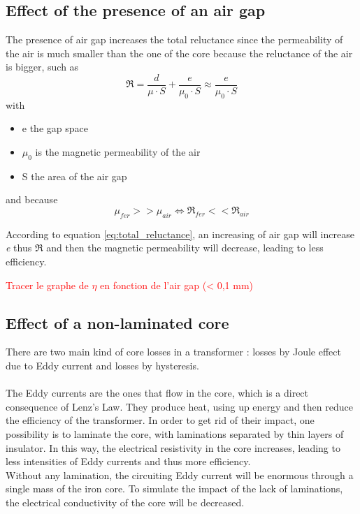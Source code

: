 \documentclass[12pt,a4paper]{report}
\begin{document}
\subsection{Effect of the presence of an air gap}
The presence of air gap increases the total reluctance since the permeability of the air is much smaller than the one of the core because the reluctance of the air is bigger, such as
\begin{equation}
    \Re = \frac{d}{\mu \cdot S} + \frac{e}{\mu_0 \cdot S} \approx \frac{e}{\mu_0 \cdot S}
    \label{eq:total_reluctance}
\end{equation}
with
\begin{itemize}
    \item e the gap space
    \item $\mu_0$ is the magnetic permeability of the air
    \item S the area of the air gap
\end{itemize}

and because 
\begin{equation}
    \mu_{fer} >> \mu_{air} \iff {\Re_{fer}} << {\Re_{air}}
\end{equation}

According to equation \ref{eq:total_reluctance}, an increasing of air gap will increase \textit{e} thus $\Re$ and then the magnetic permeability will decrease, leading to less efficiency.

\textcolor{red}{Tracer le graphe de $\eta$ en fonction de l'air gap (< 0,1 mm)}

\subsection{Effect of a non-laminated core}
There are two main kind of core losses in a transformer : losses by Joule effect due to Eddy current and losses by hysteresis.\\ \\
The Eddy currents are the ones that flow in the core, which is a direct consequence of Lenz's Law. They produce heat, using up energy and then reduce the efficiency of the transformer. In order to get rid of their impact, one possibility is to laminate the core, with laminations separated by thin layers of insulator. In this way, the electrical resistivity in the core increases, leading to less intensities of Eddy currents and thus more efficiency.\\

Without any lamination, the circuiting Eddy current will be enormous through a single mass of the iron core. To simulate the impact of the lack of laminations, the electrical conductivity of the core will be decreased.
\end{document}
